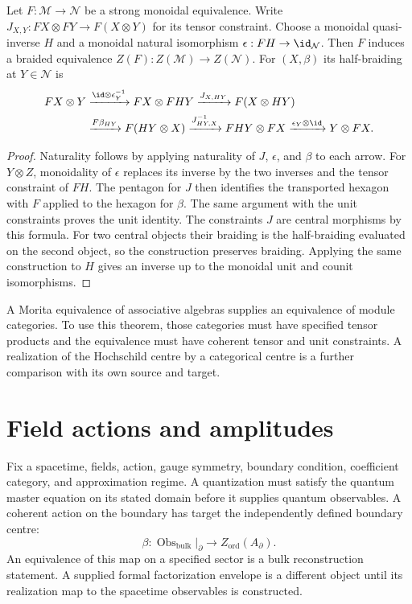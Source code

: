\begin{theorem}\label{cyarch:centre-transport}
Let $F:\mathcal M\to\mathcal N$ be a strong monoidal equivalence.
Write $J_{X,Y}:FX\otimes FY\to F(X\otimes Y)$ for its tensor constraint.
Choose a monoidal quasi-inverse $H$ and a monoidal natural isomorphism
$\epsilon:FH\to\id_{\mathcal N}$.
Then $F$ induces a braided equivalence
$Z(F):Z(\mathcal M)\to Z(\mathcal N)$.
For $(X,\beta)$ its half-braiding at $Y\in\mathcal N$ is
\[
\begin{split}
 FX\otimes Y
 &\xrightarrow{\id\otimes\epsilon_Y^{-1}}FX\otimes FHY
 \xrightarrow{J_{X,HY}}F(X\otimes HY)\\
 &\xrightarrow{F\beta_{HY}}F(HY\otimes X)
 \xrightarrow{J_{HY,X}^{-1}}FHY\otimes FX
 \xrightarrow{\epsilon_Y\otimes\id}Y\otimes FX.
\end{split}
\]
\end{theorem}
\begin{proof}
Naturality follows by applying naturality of $J$, $\epsilon$, and $\beta$
to each arrow.
For $Y\otimes Z$, monoidality of $\epsilon$ replaces its inverse by the
two inverses and the tensor constraint of $FH$.
The pentagon for $J$ then identifies the transported hexagon with
$F$ applied to the hexagon for $\beta$.
The same argument with the unit constraints proves the unit identity.
The constraints $J$ are central morphisms by this formula.
For two central objects their braiding is the half-braiding evaluated
on the second object, so the construction preserves braiding.
Applying the same construction to $H$ gives an inverse up to the
monoidal unit and counit isomorphisms.
\end{proof}

A Morita equivalence of associative algebras supplies an equivalence of
module categories.
To use this theorem, those categories must have specified tensor
products and the equivalence must have coherent tensor and unit
constraints.
A realization of the Hochschild centre by a categorical centre is a
further comparison with its own source and target.

\chapter{Field actions and amplitudes}
Fix a spacetime, fields, action, gauge symmetry, boundary condition,
coefficient category, and approximation regime.
A quantization must satisfy the quantum master equation on its stated
domain before it supplies quantum observables.
A coherent action on the boundary has target the independently defined
boundary centre:
\[
 \beta:\operatorname{Obs}_{\mathrm{bulk}}\big|_\partial
 \longrightarrow Z_{\mathrm{ord}}(A_\partial).
\]
An equivalence of this map on a specified sector is a bulk reconstruction
statement.
A supplied formal factorization envelope is a different object until
its realization map to the spacetime observables is constructed.

